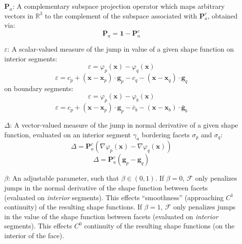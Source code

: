 \documentclass[11pt]{article} %
\begin{document}
\begin{itemize}
	\item[$\mathbf{P}_a$:] A complementary subspace projection operator which maps arbitrary vectors in $\mathbb{R}^3$ to the complement of the subspace associated with $\mathbf{P}^c_a$, obtained via:
	\begin{equation}
		\mathbf{P}_a = \mathbf{1} - \mathbf{P}^c_a
	\end{equation}
	\item[$\varepsilon$:] A scalar-valued measure of the jump in value of a given shape function on interior segments:
	\begin{equation}
		\varepsilon = \varphi_p (\mathbf{x}) - \varphi_q (\mathbf{x})
	\end{equation}
	\begin{equation}
		\varepsilon = c_p + (\mathbf{x} - \mathbf{x}_p) \cdot \mathbf{g}_p - c_q - (\mathbf{x} - \mathbf{x}_q) \cdot \mathbf{g}_q
	\end{equation}
	on boundary segments:
	\begin{equation}
		\varepsilon = \varphi_p (\mathbf{x}) - \varphi_b (\mathbf{x})
	\end{equation}
	\begin{equation}
		\varepsilon = c_p + (\mathbf{x} - \mathbf{x}_p) \cdot \mathbf{g}_p - \bar{c}_b - (\mathbf{x} - \mathbf{x}_b) \cdot \bar{\mathbf{g}}_b
	\end{equation}
	\item[$\Delta$:] A vector-valued measure of the jump in normal derivative of a given shape function, evaluated on an interior segment $\gamma_a$ bordering facets $\sigma_p$ and $\sigma_q$:
	\begin{equation}
		\Delta =\mathbf{P}^c_a ( \nabla \varphi_p (\mathbf{x}) - \nabla \varphi_q (\mathbf{x}) )
	\end{equation}
	\begin{equation}
		\Delta =\mathbf{P}^c_a ( \mathbf{g}_p - \mathbf{g}_q )
	\end{equation}
	\item[$\beta$:] An adjustable parameter, such that $\beta \in (0, 1)$. If $\beta = 0$, $\mathcal{F}$ only penalizes jumps in the normal derivative of the shape function between facets (evaluated on \textit{interior} segments). This effects ``smoothness'' (approaching $C^1$ continuity) of the resulting shape functions. If $\beta = 1$, $\mathcal{F}$ only penalizes jumps in the value of the shape function between facets (evaluated on \textit{interior} segments). This effects $C^0$ continuity of the resulting shape functions (on the interior of the face).

\end{itemize}
\end{document}
